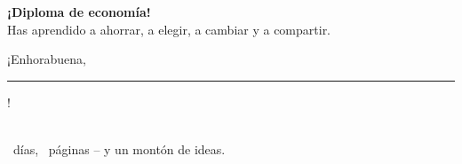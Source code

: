 \begin{center}
\vspace*{3cm}

\medalla{\totaldias}

\vspace{8mm}
{\fontsize{34}{40}\selectfont\bfseries\color{colorLectura} ¡Diploma de economía!}\\[8mm]
{\Large Has aprendido a ahorrar, a elegir, a cambiar y a compartir.}\\[10mm]
{\Large ¡Enhorabuena, \rule{65mm}{0.4pt}!}\\[14mm]
{\large \totaldias\ días, \totaldias\ páginas -- y un montón de ideas.}
\end{center}
\vspace*{\fill}
\newpage
